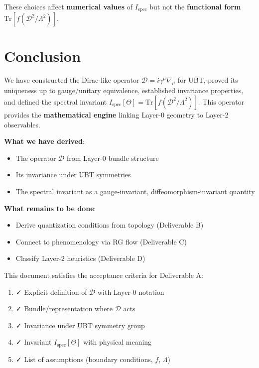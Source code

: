 \documentclass[12pt]{article}
\newcommand{\Tr}{\mathrm{Tr}}
\begin{document}
These choices affect \textbf{numerical values} of $I_{\text{spec}}$ but not the \textbf{functional form} $\Tr[f(\mathcal{D}^2/\Lambda^2)]$.

\section{Conclusion}

We have constructed the Dirac-like operator $\mathcal{D} = i \gamma^\mu \nabla_\mu$ for UBT, proved its uniqueness up to gauge/unitary equivalence, established invariance properties, and defined the spectral invariant $I_{\text{spec}}[\Theta] = \Tr[f(\mathcal{D}^2/\Lambda^2)]$. This operator provides the \textbf{mathematical engine} linking Layer-0 geometry to Layer-2 observables.

\textbf{What we have derived}:
\begin{itemize}
    \item The operator $\mathcal{D}$ from Layer-0 bundle structure
    \item Its invariance under UBT symmetries
    \item The spectral invariant as a gauge-invariant, diffeomorphism-invariant quantity
\end{itemize}

\textbf{What remains to be done}:
\begin{itemize}
    \item Derive quantization conditions from topology (Deliverable B)
    \item Connect to phenomenology via RG flow (Deliverable C)
    \item Classify Layer-2 heuristics (Deliverable D)
\end{itemize}

This document satisfies the acceptance criteria for Deliverable A:
\begin{enumerate}
    \item ✓ Explicit definition of $\mathcal{D}$ with Layer-0 notation
    \item ✓ Bundle/representation where $\mathcal{D}$ acts
    \item ✓ Invariance under UBT symmetry group
    \item ✓ Invariant $I_{\text{spec}}[\Theta]$ with physical meaning
    \item ✓ List of assumptions (boundary conditions, $f$, $\Lambda$)
\end{enumerate}
\end{document}
